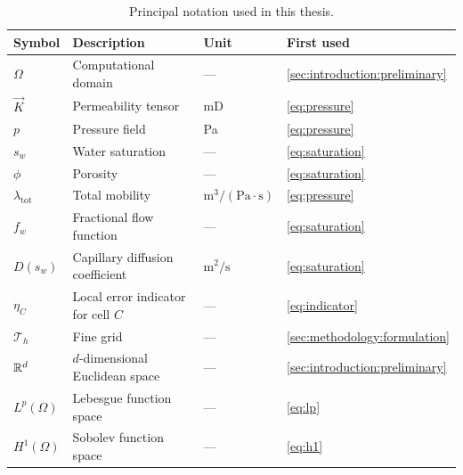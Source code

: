 \begin{table}[htbp]
    \centering
    \caption{Principal notation used in this thesis.}
    \label{tab:notation}
    \begin{tabularx}{\textwidth}{@{}l X l X@{}}
        \toprule
        \textbf{Symbol} & \textbf{Description} & \textbf{Unit} & \textbf{First used} \\
        \midrule
        $\Omega$            & Computational domain                        & ---                    & \cref{sec:introduction:preliminary} \\
        $\vec{K}$           & Permeability tensor                         & mD                     & \cref{eq:pressure} \\
        $p$                 & Pressure field                               & Pa                     & \cref{eq:pressure} \\
        $s_w$               & Water saturation                             & ---                    & \cref{eq:saturation} \\
        $\phi$              & Porosity                                     & ---                    & \cref{eq:saturation} \\
        $\lambda_{\text{tot}}$ & Total mobility                            & $\text{m}^3/(\text{Pa}\cdot\text{s})$ & \cref{eq:pressure} \\
        $f_w$               & Fractional flow function                     & ---                    & \cref{eq:saturation} \\
        $D(s_w)$            & Capillary diffusion coefficient              & $\text{m}^2/\text{s}$ & \cref{eq:saturation} \\
        $\eta_C$            & Local error indicator for cell $C$           & ---                    & \cref{eq:indicator} \\
        $\mathcal{T}_h$     & Fine grid                                   & ---                    & \autoref{sec:methodology:formulation} \\
        $\mathbb{R}^d$              & $d$-dimensional Euclidean space              & ---                    & \autoref{sec:introduction:preliminary} \\
        $L^p(\Omega)$       & Lebesgue function space                     & ---                    & \autoref{eq:lp} \\
        $H^1(\Omega)$       & Sobolev function space                      & ---                    & \autoref{eq:h1} \\
        \bottomrule
    \end{tabularx}
\end{table}

